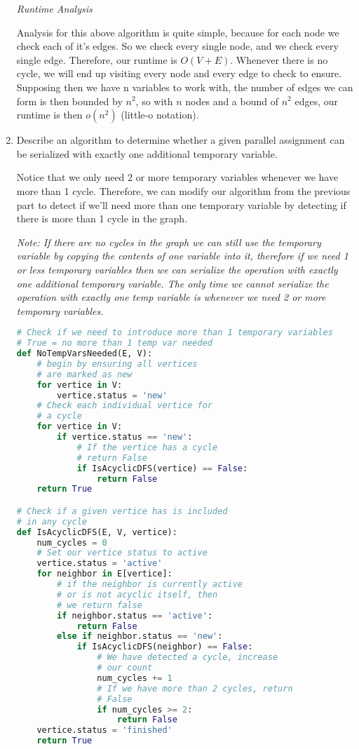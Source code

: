 \documentclass[11pt, letterpaper]{article}
\begin{document}
\begin{enumerate}
\begin{center}
\textit{Runtime Analysis}
\end{center}

\quad Analysis for this above algorithm is quite simple, because for each node we check each of it's edges. So we check every single node, and we check every single edge. Therefore, our runtime is $O(V + E)$. Whenever there is no cycle, we will end up visiting every node and every edge to check to ensure. Supposing then we have n variables to work with, the number of edges we can form is then bounded by $n^2$, so with $n$ nodes and a bound of $n^2$ edges, our runtime is then $o(n^2)$ (little-o notation).

\pagebreak

\item Describe an algorithm to determine whether a given parallel assignment can be serialized with exactly one additional temporary variable. 

\quad Notice that we only need 2 or more temporary variables whenever we have more than 1 cycle. Therefore, we can modify our algorithm from the previous part to detect if we'll need more than one temporary variable by detecting if there is more than 1 cycle in the graph.

\textit{Note: If there are no cycles in the graph we can still use the temporary variable by copying the contents of one variable into it, therefore if we need 1 or less temporary variables then we can serialize the operation with exactly one additional temporary variable. The only time we cannot serialize the operation with exactly one temp variable is whenever we need 2 or more temporary variables.}

\begin{lstlisting}[language=Python]
# Check if we need to introduce more than 1 temporary variables
# True = no more than 1 temp var needed
def NoTempVarsNeeded(E, V):
    # begin by ensuring all vertices
    # are marked as new
    for vertice in V:
        vertice.status = 'new'
    # Check each individual vertice for
    # a cycle
    for vertice in V:
        if vertice.status == 'new':
            # If the vertice has a cycle
            # return False
            if IsAcyclicDFS(vertice) == False:
                return False
    return True

# Check if a given vertice has is included
# in any cycle
def IsAcyclicDFS(E, V, vertice):
    num_cycles = 0
    # Set our vertice status to active
    vertice.status = 'active'
    for neighbor in E[vertice]:
        # if the neighbor is currently active
        # or is not acyclic itself, then
        # we return false
        if neighbor.status == 'active':
            return False
        else if neighbor.status == 'new':
            if IsAcyclicDFS(neighbor) == False:
                # We have detected a cycle, increase
                # our count
                num_cycles += 1
                # If we have more than 2 cycles, return
                # False
                if num_cycles >= 2:
                    return False
    vertice.status = 'finished'
    return True
\end{lstlisting}


\end{enumerate}
\end{document}
